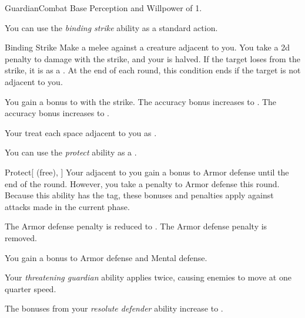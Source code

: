     \begin{feat}{Guardian}{Combat}
        \featpre Base Perception and Willpower of 1.

         You can use the \textit{binding strike} ability as a standard action.
        \begin{freeability}{Binding Strike}
            Make a melee  against a creature adjacent to you.
            You take a \minus2d penalty to damage with the strike, and your  is halved.
            If the target loses  from the strike, it is  as a .
                At the end of each round, this condition ends if the target is not adjacent to you.

            \rankline
             You gain a  bonus to  with the strike.
             The accuracy bonus increases to .
             The accuracy bonus increases to .
        \end{freeability}

         Your  treat each space adjacent to you as .

         You can use the \textit{protect} ability as a .
        \begin{freeability}{Protect}[ (free), ]
            Your  adjacent to you gain a  bonus to Armor defense until the end of the round.
            However, you take a  penalty to Armor defense this round.
            Because this ability has the  tag, these bonuses and penalties apply against attacks made in the current phase.

            \rankline
             The Armor defense penalty is reduced to .
             The Armor defense penalty is removed.
        \end{freeability}

         You gain a  bonus to Armor defense and Mental defense.

         Your \textit{threatening guardian} ability applies  twice, causing enemies to move at one quarter speed.

         The bonuses from your \textit{resolute defender} ability increase to .
    \end{feat}

